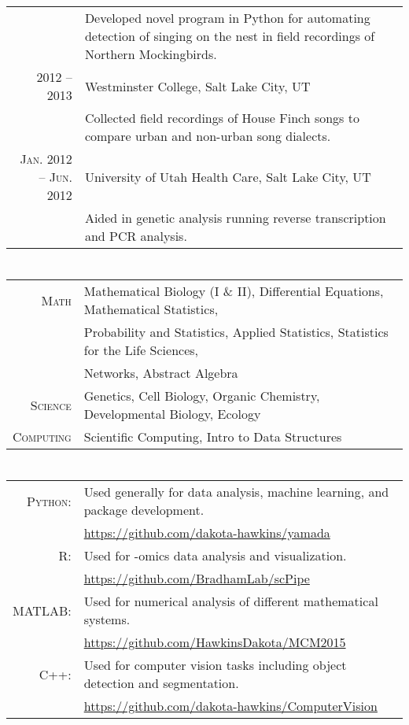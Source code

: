 \documentclass[a4paper,10pt]{article}
\begin{document}
\begin{tabular}{rp{10cm}}
& \footnotesize{Developed novel program in Python for automating detection of
                singing on the nest in field recordings of Northern Mockingbirds.}\\
\textsc{2012 -- 2013} & Westminster College, Salt Lake City, UT\\
& \footnotesize{Collected field recordings of House Finch songs to compare urban
                and non-urban song dialects.}\\
\textsc{Jan. 2012 -- Jun. 2012} & University of Utah Health Care, Salt Lake City, UT
\\& \footnotesize{Aided in genetic analysis running reverse transcription and PCR analysis.}
\end{tabular}

\section{\color{linkcolour}{Relevant Course Work}}
\begin{tabular}{rl}
\textsc{Math} & Mathematical Biology (I \& II), Differential Equations, Mathematical Statistics,
\\ & Probability and Statistics, Applied Statistics, Statistics for the Life Sciences,
\\ & Networks, Abstract Algebra \\
\textsc{Science} & Genetics, Cell Biology, Organic Chemistry, Developmental Biology, Ecology \\
\textsc{Computing} & Scientific Computing, Intro to Data Structures
\end{tabular}

\section{\color{linkcolour}{Programming Languages}}
\begin{tabular}{rl}
	\textsc{Python:}& Used generally for data analysis, machine learning, and package development.\\
	& \small{\href{https://github.com/dakota-hawkins/yamada}{https://github.com/dakota-hawkins/yamada}}\\
	\textsc{R:}& Used for -omics data analysis and visualization.\\
	& \small{\href{https://github.com/BradhamLab/scPipe}{https://github.com/BradhamLab/scPipe}} \\
	\textsc{MATLAB:}& Used for numerical analysis of different mathematical systems.\\
	& \small{\href{https://github.com/HawkinsDakota/MCM2015}{https://github.com/HawkinsDakota/MCM2015}}\\
	\textsc{C++:} & Used for computer vision tasks including object detection and segmentation.\\
	& \small{\href{https://github.com/dakota-hawkins/ComputerVision}{https://github.com/dakota-hawkins/ComputerVision}} \\
\end{tabular}
\end{document}
